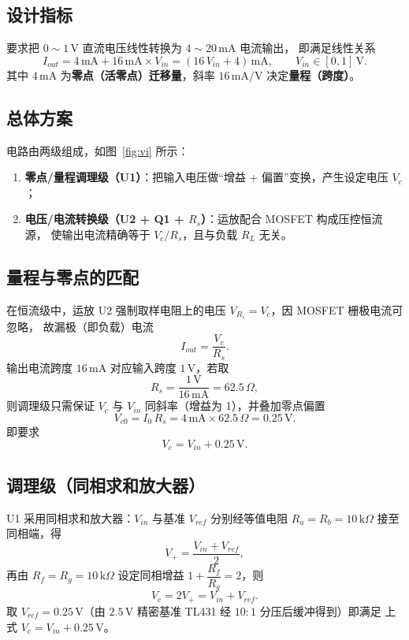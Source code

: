 \documentclass[12pt,a4paper]{ctexart}
\begin{document}
\subsection{设计指标}
要求把 $0\!\sim\!1\,\mathrm{V}$ 直流电压线性转换为 $4\!\sim\!20\,\mathrm{mA}$ 电流输出，
即满足线性关系
\begin{equation}
I_{out}=4\,\mathrm{mA}+16\,\mathrm{mA}\times V_{in}
       =\left(16\,V_{in}+4\right)\,\mathrm{mA},\qquad V_{in}\in[0,1]\,\mathrm{V}.
\end{equation}
其中 $4\,\mathrm{mA}$ 为\textbf{零点（活零点）迁移量}，斜率 $16\,\mathrm{mA/V}$ 决定\textbf{量程（跨度）}。

\subsection{总体方案}
电路由两级组成，如图~\ref{fig:vi} 所示：
\begin{enumerate}
  \item \textbf{零点/量程调理级（U1）}：把输入电压做“增益 + 偏置”变换，产生设定电压 $V_c$；
  \item \textbf{电压/电流转换级（U2 + Q1 + $R_s$）}：运放配合 MOSFET 构成压控恒流源，
        使输出电流精确等于 $V_c/R_s$，且与负载 $R_L$ 无关。
\end{enumerate}

\subsection{量程与零点的匹配}
在恒流级中，运放 U2 强制取样电阻上的电压 $V_{R_s}=V_c$，因 MOSFET 栅极电流可忽略，
故漏极（即负载）电流
\begin{equation}
I_{out}=\frac{V_c}{R_s}.
\end{equation}
输出电流跨度 $16\,\mathrm{mA}$ 对应输入跨度 $1\,\mathrm{V}$，若取
\begin{equation}
R_s=\frac{1\,\mathrm{V}}{16\,\mathrm{mA}}=62.5\,\Omega,
\end{equation}
则调理级只需保证 $V_c$ 与 $V_{in}$ 同斜率（增益为 1），并叠加零点偏置
\begin{equation}
V_{c0}=I_{0}\,R_s=4\,\mathrm{mA}\times 62.5\,\Omega=0.25\,\mathrm{V}.
\end{equation}
即要求
\begin{equation}
V_c=V_{in}+0.25\,\mathrm{V}.
\end{equation}

\subsection{调理级（同相求和放大器）}
U1 采用同相求和放大器：$V_{in}$ 与基准 $V_{ref}$ 分别经等值电阻 $R_a=R_b=10\,\mathrm{k}\Omega$
接至同相端，得
\begin{equation}
V_+=\frac{V_{in}+V_{ref}}{2},
\end{equation}
再由 $R_f=R_g=10\,\mathrm{k}\Omega$ 设定同相增益 $1+\dfrac{R_f}{R_g}=2$，则
\begin{equation}
V_c=2V_+=V_{in}+V_{ref}.
\end{equation}
取 $V_{ref}=0.25\,\mathrm{V}$（由 $2.5\,\mathrm{V}$ 精密基准 TL431 经 $10\!:\!1$ 分压后缓冲得到）即满足
上式 $V_c=V_{in}+0.25\,\mathrm{V}$。
\end{document}
